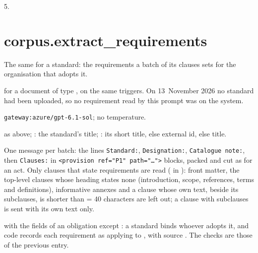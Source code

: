  5.


\section{corpus.extract\_requirements}\label{sec:aprompts:corpus-extract_requirements}

 The same for a standard: the requirements a batch of its clauses
sets for the organisation that adopts it.

  for a document of type
, on the same triggers. On 13~November 2026 no standard had been uploaded, so
no requirement read by this prompt was on the system.

 \texttt{gateway:azure/gpt-6.1-sol}; no temperature.

  as above; : the
standard's title; : its short title, else external id, else title.

 One message per batch: the lines \texttt{Standard:},
\texttt{Designation:}, \texttt{Catalogue note:}, then \texttt{Clauses:} in
\texttt{<provision ref="P1" path="…">} blocks, packed and cut as for an act. Only clauses that
state requirements are read ( in ): front
matter, the top-level clauses whose heading states none (introduction, scope, references,
terms and definitions), informative annexes and a clause whose own text, beside its
subclauses, is shorter than  = 40 characters are left out; a clause with
subclauses is sent with its own text only.

  with the fields of an obligation
except : a standard binds whoever adopts it, and code records each
requirement as applying to , with source . The checks are those of the
previous entry.

